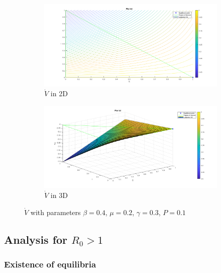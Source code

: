 \begin{figure}[h!]
    \centering
    \label{fig:lyapunov_derivative_r0_minor_1}
    \begin{subfigure}{\textwidth}
        \centering
        \includegraphics[width=\linewidth]{Figure/lyapunov_derivative_2d_R0_minor_1.png}  
        \caption{$\dot{V}$ in 2D}
        \label{fig:lyapunov_derivative_r0_minor_1_first}
    \end{subfigure}
    \begin{subfigure}{\textwidth}
        \centering
        \includegraphics[width=\linewidth]{Figure/lyapunov_derivative_3d_R0_minor_1.png}  
        \caption{$\dot{V}$ in 3D}
        \label{fig:lyapunov_derivative_r0_minor_1_second}
    \end{subfigure}
    \caption{$\dot{V}$ with parameters $\beta = 0.4$, $\mu = 0.2$, $\gamma = 0.3$, $P = 0.1$}
\end{figure}

\break
\subsection{Analysis for $R_0 > 1$}
\subsubsection{Existence of equilibria}

